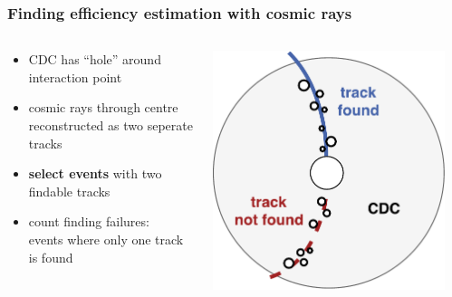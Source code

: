 \documentclass[18pt, aspectratio=169]{beamer}
\newcommand{\kitemph}[1]{\textcolor{kit-green100}{\bf{#1}}}
\begin{document}
\begin{frame}
  \frametitle{Finding efficiency estimation with cosmic rays}
  \begin{columns}
    \begin{column}{0.5\textwidth}
      \begin{itemize}
      \item CDC has ``hole'' around interaction point
      \item cosmic rays through centre reconstructed as two seperate tracks
      \item \kitemph{select events} with \textcolor{kit-blue100}{two findable tracks}
      \item count  \textcolor{kit-red100}{finding failures}:\\events where only one track is found
      \end{itemize}
    \end{column}
    \begin{column}{0.3\textwidth}
      \centering
      \includegraphics[width=1.0\textwidth]{figures/cdc_finding_fail_diagram.pdf}
    \end{column}
    \begin{column}{0.2\textwidth}
      \centering

\end{column}
\end{columns}
\end{frame}
\end{document}
